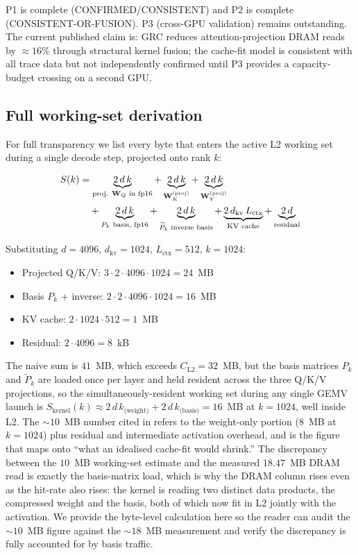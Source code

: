 \documentclass[11pt]{article}
\providecommand{\Wmat}{\mathbf{W}}
\begin{document}
P1 is complete (CONFIRMED/CONSISTENT) and P2 is complete (CONSISTENT-OR-FUSION).
P3 (cross-GPU validation) remains outstanding.
The current published claim is: GRC reduces attention-projection DRAM reads
by $\approx16\%$ through structural kernel fusion; the cache-fit model is
consistent with all trace data but not independently confirmed until
P3 provides a capacity-budget crossing on a second GPU.

\subsection{Full working-set derivation}
\label{sec:workingset-math}

For full transparency we list every byte that enters the active L2
working set during a single decode step, projected onto rank $k$:

\begin{align}
S(k) &= \underbrace{2\,d\,k}_{\text{proj. }\Wmat_Q\text{ in fp16}}
       + \underbrace{2\,d\,k}_{\Wmat_K^{(\text{proj})}}
       + \underbrace{2\,d\,k}_{\Wmat_V^{(\text{proj})}}\notag\\
     &\quad + \underbrace{2\,d\,k}_{P_k\text{ basis, fp16}}
       + \underbrace{2\,d\,k}_{\widetilde P_k\text{ inverse basis}}
       + \underbrace{2\,d_\text{kv}\,L_\text{ctx}}_{\text{KV cache}}
       + \underbrace{2\,d}_{\text{residual}} \label{eq:Sk}
\end{align}

Substituting $d{=}4096$, $d_\text{kv}{=}1024$, $L_\text{ctx}{=}512$,
$k{=}1024$:
\begin{itemize}
\item Projected Q/K/V: $3\cdot 2\cdot 4096\cdot 1024 = 24$~MB
\item Basis $P_k$ + inverse: $2\cdot 2\cdot 4096\cdot 1024 = 16$~MB
\item KV cache: $2\cdot 1024\cdot 512 = 1$~MB
\item Residual: $2\cdot 4096 = 8$~kB
\end{itemize}

The naive sum is $41$~MB, which exceeds $C_\text{L2}{=}32$~MB, but the
basis matrices $P_k$ and $\widetilde P_k$ are loaded once per layer and
held resident across the three Q/K/V projections, so the
simultaneously-resident working set during any single GEMV
launch is $S_\text{kernel}(k) \approx 2\,d\,k_\text{(weight)} +
2\,d\,k_\text{(basis)} = 16$~MB at $k{=}1024$, well inside L2. The
${\sim}10$~MB number cited in  refers to the
weight-only portion ($8$~MB at $k{=}1024$) plus residual and
intermediate activation overhead, and is the figure that maps onto
``what an idealised cache-fit would shrink.'' The discrepancy between
the $10$~MB working-set estimate and the measured $18.47$~MB DRAM read
is exactly the basis-matrix load, which is why the DRAM column rises
even as the hit-rate also rises: the kernel is reading two distinct
data products, the compressed weight and the basis, both of which now
fit in L2 jointly with the activation. We provide the byte-level
calculation here so the reader can audit the ${\sim}10$~MB figure
against the ${\sim}18$~MB measurement and verify the discrepancy is
fully accounted for by basis traffic.
\end{document}
